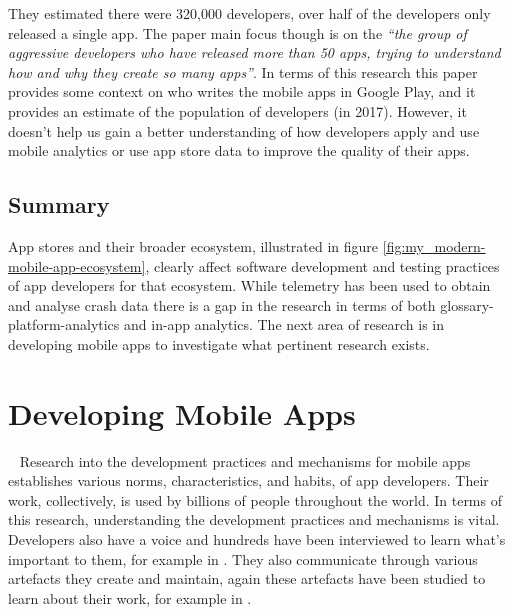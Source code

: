They estimated there were 320,000 developers, over half of the developers only released a single app. The paper main focus though is on the \emph{``the group of aggressive developers who have released more than 50 apps, trying to understand how and why they create so many apps''}. In terms of this research this paper provides some context on who writes the mobile apps in Google Play, and it provides an estimate of the population of developers (in 2017). However, it doesn't help us gain a better understanding of how developers apply and use mobile analytics or use app store data to improve the quality of their apps.

\subsection{Summary} %
App stores and their broader ecosystem, illustrated in figure \ref{fig:my_modern-mobile-app-ecosystem}, clearly affect software development and testing practices of app developers for that ecosystem. While telemetry has been used to obtain and analyse crash data there is a gap in the research in terms of both \gls{glossary-platform-analytics} and in-app analytics. The next area of research is in developing mobile apps to investigate what pertinent research exists.


\section{Developing Mobile Apps}~\label{rw-developing-mobile-apps-section}
Research into the development practices and mechanisms for mobile apps establishes various norms, characteristics, and habits, of app developers. Their work, collectively, is used by billions of people throughout the world. In terms of this research, understanding the development practices and mechanisms is vital. Developers also have a voice and hundreds have been interviewed to learn what's important to them, for example in . They also communicate through various artefacts they create and maintain, again these artefacts have been studied to learn about their work, for example in .


